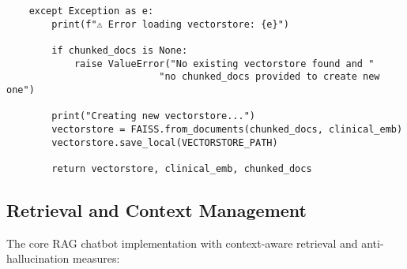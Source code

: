 \begin{verbatim}
    except Exception as e:
        print(f"⚠️ Error loading vectorstore: {e}")
        
        if chunked_docs is None:
            raise ValueError("No existing vectorstore found and "
                           "no chunked_docs provided to create new one")
        
        print("Creating new vectorstore...")
        vectorstore = FAISS.from_documents(chunked_docs, clinical_emb)
        vectorstore.save_local(VECTORSTORE_PATH)
        
        return vectorstore, clinical_emb, chunked_docs
\end{verbatim}

\subsection{Retrieval and Context Management}

The core RAG chatbot implementation with context-aware retrieval and anti-hallucination measures:

